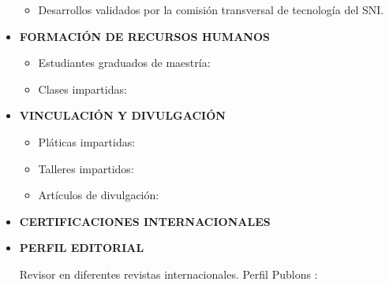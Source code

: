 \documentclass[10pt]{article}
\begin{document}
\begin{itemize}
\begin{itemize}
	\item Desarrollos validados por la comisión transversal de tecnología del SNI.
	
\end{itemize}


\vspace{0.5cm}
\item{\bf FORMACIÓN DE RECURSOS HUMANOS}

\begin{itemize}
	\item Estudiantes graduados de maestría:
	
	
	\item Clases impartidas:
	
\end{itemize}


\vspace{0.5cm}
\item \textbf{VINCULACIÓN Y DIVULGACIÓN}

\begin{itemize}
	\item Pláticas impartidas:
	
	
	\item Talleres impartidos:
	
	
	\item Artículos de divulgación:
	
\end{itemize}


\vspace{0.5cm}
\item \textbf{CERTIFICACIONES INTERNACIONALES}
	

\vspace{0.5cm}
\item \textbf{PERFIL EDITORIAL}

Revisor en diferentes revistas internacionales. Perfil Publons \href{https://publons.com/author/1349368}{\faExternalLink}: 



%



\end{itemize}
\end{document}
